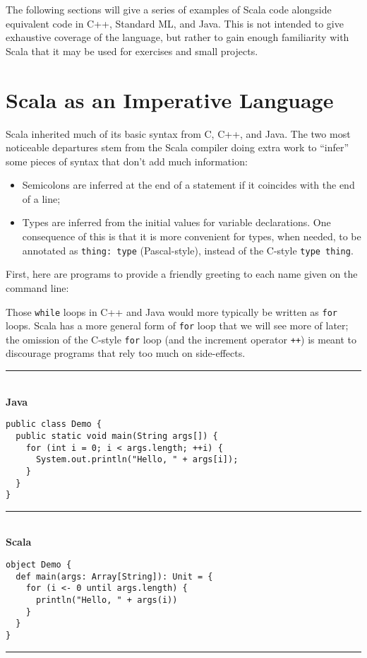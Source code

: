 \documentclass[11pt]{article}
\begin{document}
The following sections will give a series of examples of Scala code alongside equivalent code in C++, Standard ML, and Java. This is not intended to give exhaustive coverage of the language, but rather to gain enough familiarity with Scala that it may be used for exercises and small projects.

\section{Scala as an Imperative Language}
Scala inherited much of its basic syntax from C, C++, and Java. The two most noticeable departures stem from the Scala compiler doing extra work to ``infer'' some pieces of syntax that don't add much information:
\begin{itemize}
\item Semicolons are inferred at the end of a statement if it coincides with the end of a line;
\item Types are inferred from the initial values for variable declarations. One consequence of this is that it is more convenient for types, when needed, to be annotated as \verb|thing: type| (Pascal-style), instead of the C-style \verb|type thing|.
\end{itemize}

First, here are programs to provide a friendly greeting to each name given on the command line:

Those \texttt{while} loops in C++ and Java would more typically be written as \texttt{for} loops. Scala has a more general form of \texttt{for} loop that we will see more of later; the omission of the C-style \texttt{for} loop (and the increment operator \verb|++|) is meant to discourage programs that rely too much on side-effects.

\noindent\rule{\textwidth}{1pt}\\\textbf{Java}
\begin{verbatim}
public class Demo {
  public static void main(String args[]) {
    for (int i = 0; i < args.length; ++i) {
      System.out.println("Hello, " + args[i]);
    }
  }
}
\end{verbatim}
\rule{\textwidth}{1pt}\\\textbf{Scala}
\begin{verbatim}
object Demo {
  def main(args: Array[String]): Unit = {
    for (i <- 0 until args.length) {
      println("Hello, " + args(i))
    }
  }
}
\end{verbatim}
\rule{\textwidth}{1pt}
\end{document}
